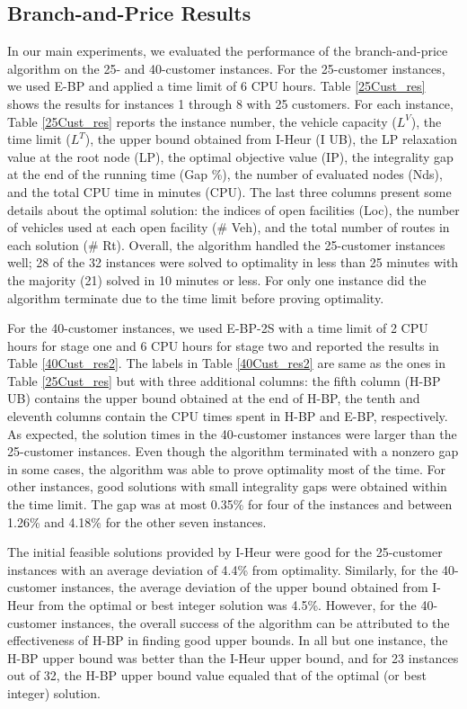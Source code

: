 \documentclass[11pt]{article}
\begin{document}
\subsection{Branch-and-Price Results}
\label{bp-results}
In our main experiments, we evaluated the performance of the branch-and-price
algorithm on the 25- and 40-customer instances.
For the 25-customer instances, we used E-BP and applied a time limit of 6 CPU hours. Table 
\ref{25Cust_res} shows the results for instances 1 through 8 with 25 customers. 
For each instance, Table \ref{25Cust_res} reports the instance number, the vehicle
capacity ($L^V$), the time limit ($L^T$), the upper bound obtained from I-Heur (I UB), 
the LP relaxation value at the root node (LP), the optimal objective value (IP), 
the integrality gap at the end of the running time (Gap \%), the number of evaluated 
nodes (Nds), and the total CPU time in minutes (CPU). The last three columns present
some details about the optimal solution: the indices of open facilities
(Loc), the number of vehicles used at each open facility (\# Veh), and the total number 
of routes in each solution (\# Rt). Overall, the algorithm handled the 25-customer
instances well; 28 of the 
32 instances were solved to optimality in less than 25 minutes with the majority (21) 
solved in 10 minutes or less. For only one instance did the algorithm terminate due to the 
time limit before proving optimality. 

For the 40-customer instances, we used E-BP-2S with a time limit of 2 CPU hours for
stage one and 6 CPU hours for stage two and reported the results in Table \ref{40Cust_res2}.
The labels in Table \ref{40Cust_res2} are same as the ones in Table \ref{25Cust_res}
but with three additional columns: the fifth column (H-BP UB) contains
the upper bound obtained at the end of H-BP, the tenth and eleventh columns contain
the CPU times spent in H-BP and E-BP, respectively. As expected, 
the solution times in the 40-customer instances were larger than the 25-customer instances. 
Even though the algorithm terminated with a nonzero gap in some cases, 
the algorithm was able to prove optimality most of the time. 
For other instances, good solutions with small integrality gaps were obtained
within the time limit.  The gap was at most 0.35\% for four of the instances and between 
1.26\% and 4.18\% for the other seven instances.


The initial feasible solutions provided by I-Heur were good for the 25-customer
instances with an average deviation of 4.4\% from optimality. Similarly,
for the 40-customer instances, the average deviation of the upper bound obtained
from I-Heur from the optimal or best integer solution was 4.5\%. 
However, for the 40-customer instances, the overall success of the algorithm can be 
attributed to the effectiveness of H-BP in finding good upper bounds. In all but one 
instance, the H-BP upper bound was better than the I-Heur upper bound, and for 23 instances 
out of 32, the H-BP upper bound value equaled that of the optimal (or best integer) solution. 
\end{document}

